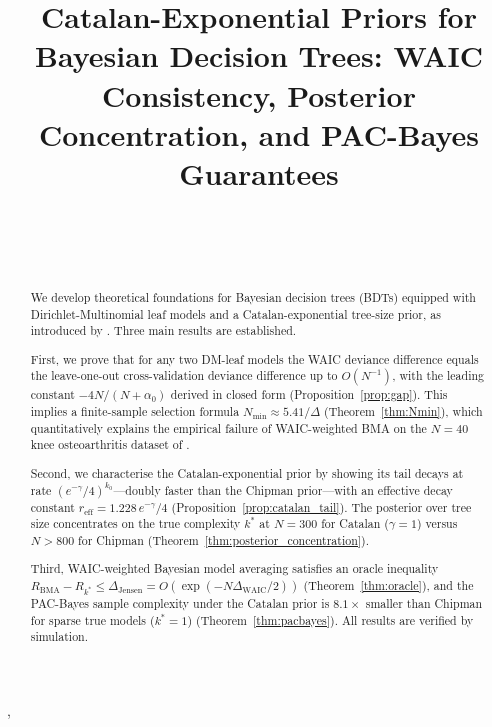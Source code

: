 \documentclass[ba]{imsart}
\theoremstyle{plain}
\theoremstyle{definition}
\theoremstyle{remark}
\newcommand{\waic}{\mathrm{WAIC}}
\newcommand{\Nmin}{N_{\min}}
\newcommand{\reff}{r_{\mathrm{eff}}}
\newcommand{\Rbma}{R_{\mathrm{BMA}}}
\newcommand{\Rora}{R_{k^*}}
\begin{document}
\begin{frontmatter}

\title{Catalan-Exponential Priors for Bayesian Decision Trees:
       WAIC Consistency, Posterior Concentration, and PAC-Bayes Guarantees}


\begin{aug}
\author[A]{~},
\author[A]{~}
\address[A]{School of Computing and Engineering,
            University of Bedfordshire, Luton, UK%
            }
\end{aug}

\begin{abstract}
We develop theoretical foundations for Bayesian decision trees (BDTs) equipped
with Dirichlet-Multinomial leaf models and a Catalan-exponential tree-size prior,
as introduced by \citet{schetinin2025}.
Three main results are established.

First, we prove that for any two DM-leaf models the WAIC deviance difference
equals the leave-one-out cross-validation deviance difference up to $O(N^{-1})$,
with the leading constant $-4N/(N+\alpha_0)$ derived in closed form
(Proposition~\ref{prop:gap}).
This implies a finite-sample selection formula
$\Nmin \approx 5.41/\Delta$ (Theorem~\ref{thm:Nmin}),
which quantitatively explains the empirical failure of WAIC-weighted BMA on
the $N=40$ knee osteoarthritis dataset of \citet{jakaite2021}.

Second, we characterise the Catalan-exponential prior by showing its tail
decays at rate $(e^{-\gamma}/4)^{k_0}$---doubly faster than the Chipman
prior---with an effective decay constant $\reff = 1.228\,e^{-\gamma}/4$
(Proposition~\ref{prop:catalan_tail}).
The posterior over tree size concentrates on the true complexity $k^*$ at
$N=300$ for Catalan ($\gamma=1$) versus $N>800$ for Chipman
(Theorem~\ref{thm:posterior_concentration}).

Third, WAIC-weighted Bayesian model averaging satisfies an oracle inequality
$\Rbma - \Rora \leq \Delta_{\mathrm{Jensen}} = O(\exp(-N\Delta_{\waic}/2))$
(Theorem~\ref{thm:oracle}), and
the PAC-Bayes sample complexity under the Catalan prior is
$8.1\times$ smaller than Chipman for sparse true models ($k^*=1$)
(Theorem~\ref{thm:pacbayes}).
All results are verified by simulation.
\end{abstract}


\end{frontmatter}
\end{document}
